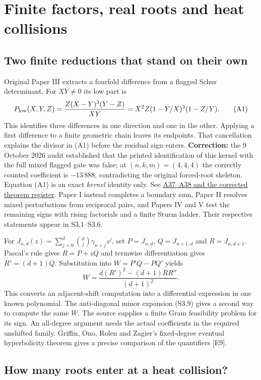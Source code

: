 \documentclass[
  10pt,
  a4paper,
  10pt,
  oneside,
  openany]{book}
\begin{document}
\section{Finite factors, real roots and heat
collisions}\label{atlas-algebra}

\subsection{Two finite reductions that stand on their
own}\label{two-finite-reductions-that-stand-on-their-own}

Original Paper III extracts a fourfold difference from a flagged Schur
determinant. For \(XY\ne0\) its low part is \[
 P_{\rm low}(X,Y,Z)=\frac{Z(X-Y)^3(Y-Z)}{XY}
     =X^2Z(1-Y/X)^3(1-Z/Y).
 \tag{A1}\label{eq:A1}
\] This identifies three differences in one direction and one in the
other. Applying a first difference to a finite geometric chain leaves
its endpoints. That cancellation explains the divisor in (A1) before the
residual sign enters. \textbf{Correction:} the 9 October 2026 audit
established that the printed identification of this kernel with the full
mixed flagged gate was false; at \((n,k,m)=(4,4,4)\) the correctly
counted coefficient is \(-13\,888\), contradicting the original
forced-root skeleton. Equation (A1) is an exact \emph{kernel} identity
only. See \hyperref[atlas-corrected-original-paper-iii]{A37--A38 and the
corrected theorem register}. Paper I instead completes a boundary sum,
Paper II resolves mixed perturbations from reciprocal pairs, and Papers
IV and V test the remaining signs with rising factorials and a finite
Sturm ladder. Their respective statements appear in S3.1--S3.6.

For \(J_{n,d}(z)=\sum_{j=0}^{d}\binom dj\gamma_{n+j}z^j\), set
\(P=J_{n,d}\), \(Q=J_{n+1,d}\) and \(R=J_{n,d+1}\). Pascal's rule gives
\(R=P+zQ\) and termwise differentiation gives \(R'=(d+1)Q\).
Substitution into \(W=P'Q-PQ'\) yields \[
 W=\frac{d(R')^2-(d+1)RR''}{(d+1)^2}.
 \tag{A2}\label{eq:A2}
\] This converts an adjacent-shift computation into a differential
expression in one known polynomial. The anti-diagonal minor expansion
(S3.9) gives a second way to compute the same \(W\). The source supplies
a finite Gram feasibility problem for its sign. An all-degree argument
needs the actual coefficients in the required unshifted family. Griffin,
Ono, Rolen and Zagier's fixed-degree eventual hyperbolicity theorem
gives a precise comparison of the quantifiers {[}E9{]}.

\subsection{How many roots enter at a heat
collision?}\label{how-many-roots-enter-at-a-heat-collision}
\end{document}
